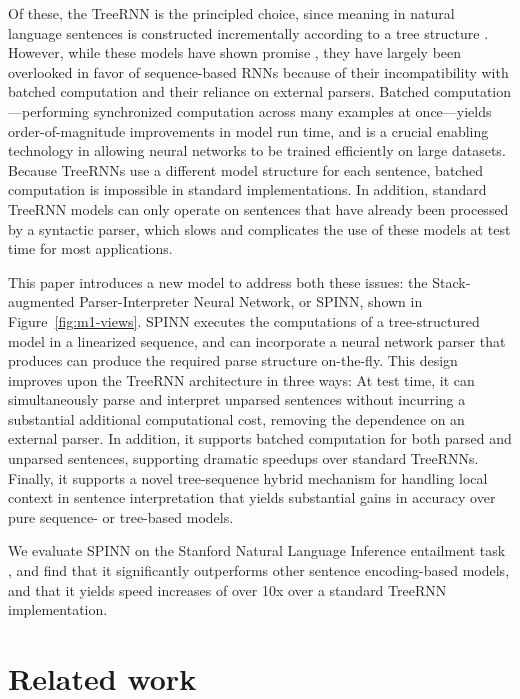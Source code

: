 \documentclass[11pt]{article}
\begin{document}
Of these, the TreeRNN is the principled choice, since meaning in natural language sentences is constructed incrementally according to a tree structure \citep[][i.a.]{Szabolcsi:2009}. However, while these models have shown promise \citep{tai2015improved,li2015tree,bowman2015trees}, they have largely been overlooked in favor of sequence-based RNNs because of their incompatibility with batched computation and their reliance on external parsers.  Batched computation---performing synchronized computation across many examples at once---yields order-of-magnitude improvements in model run time, and is a crucial enabling technology in allowing neural networks to be trained efficiently on large datasets. Because TreeRNNs use a different model structure for each sentence, batched computation is impossible in standard implementations. In addition, standard TreeRNN models can only operate on sentences that have already been processed by a syntactic parser, which slows and complicates the use of these models at test time for most applications.

This paper introduces a new model to address both these issues: the Stack-augmented Parser-Interpreter Neural Network, or SPINN, shown in Figure~\ref{fig:m1-views}. SPINN executes the computations of a tree-structured model in a linearized sequence, and can incorporate a neural network parser that produces can produce the required parse structure on-the-fly. This design improves upon the TreeRNN architecture in three ways: At test time, it can simultaneously parse and interpret unparsed sentences without incurring a substantial additional computational cost, removing the dependence on an external parser. In addition, it supports batched computation for both parsed and unparsed sentences, supporting dramatic speedups over standard TreeRNNs. Finally, it supports a novel tree-sequence hybrid mechanism for handling local context in sentence interpretation that yields substantial gains in accuracy over pure sequence- or tree-based models.

We evaluate SPINN on the Stanford Natural Language Inference entailment task \citep[SNLI,][]{snli:emnlp2015}, and find that it significantly outperforms other sentence encoding-based models, and that it yields speed increases of over 10x over a standard TreeRNN implementation.

\section{Related work}
\end{document}
